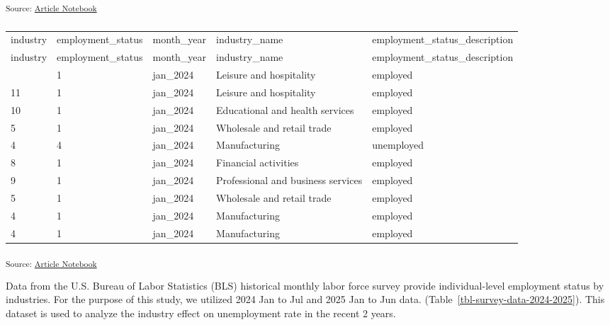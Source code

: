 \documentclass[
]{agujournal2019}
\begin{document}
\textsubscript{Source:
\href{https://mw1296.github.io/dsan5650_social_causal_inference/index.qmd.html}{Article
Notebook}}

\begin{longtable}[]{@{}lllll@{}}

\caption{\label{tbl-survey-data-2024-2025}BLS 2024 - 2025 Jan - Jul
Labor Force Survey Data}

\tabularnewline

\caption{}\label{T_37ec8}\tabularnewline
\toprule\noalign{}
industry & employment\_status & month\_year & industry\_name &
employment\_status\_description \\
\midrule\noalign{}
\endfirsthead
\toprule\noalign{}
industry & employment\_status & month\_year & industry\_name &
employment\_status\_description \\
\midrule\noalign{}
\endhead
\bottomrule\noalign{}
\endlastfoot
11 & 1 & jan\_2024 & Leisure and hospitality & employed \\
11 & 1 & jan\_2024 & Leisure and hospitality & employed \\
10 & 1 & jan\_2024 & Educational and health services & employed \\
5 & 1 & jan\_2024 & Wholesale and retail trade & employed \\
4 & 4 & jan\_2024 & Manufacturing & unemployed \\
8 & 1 & jan\_2024 & Financial activities & employed \\
9 & 1 & jan\_2024 & Professional and business services & employed \\
5 & 1 & jan\_2024 & Wholesale and retail trade & employed \\
4 & 1 & jan\_2024 & Manufacturing & employed \\
4 & 1 & jan\_2024 & Manufacturing & employed \\

\end{longtable}

\textsubscript{Source:
\href{https://mw1296.github.io/dsan5650_social_causal_inference/index.qmd.html}{Article
Notebook}}

Data from the U.S. Bureau of Labor Statistics (BLS) historical monthly
labor force survey provide individual-level employment status by
industries. For the purpose of this study, we utilized 2024 Jan to Jul
and 2025 Jan to Jun data. (Table~\ref{tbl-survey-data-2024-2025}). This
dataset is used to analyze the industry effect on unemployment rate in
the recent 2 years.
\end{document}
